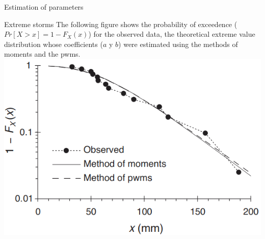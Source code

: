 \documentclass[8pt]{beamer}
\renewcommand{\emph}[1]{\textcolor{myorange}{#1}}
\begin{document}
\begin{frame}{Estimation of parameters}
    \begin{exampleblock}{Extreme storms}
        The following figure shows the probability of exceedence ($Pr[X>x] = 1 - F_X (x)$) for the observed data, the theoretical extreme value distribution whose coefficients ($a$ y $b$) were estimated using the \emph{methods of moments} and the \emph{pwms}.  
    \includegraphics[width=\textwidth]{fi325.png}
    \end{exampleblock}
\end{frame}
\end{document}
